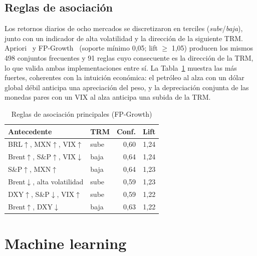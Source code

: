 \documentclass[conference]{IEEEtran}
\begin{document}
\subsection{Reglas de asociación}
Los retornos diarios de ocho mercados se discretizaron en terciles (\emph{sube}/\emph{baja}), junto con un indicador de alta volatilidad y la dirección de la siguiente TRM. Apriori~\cite{agrawal1994} y FP-Growth~\cite{han2000} (soporte mínimo 0,05; lift $\geq$ 1,05) producen los mismos 498 conjuntos frecuentes y 91 reglas cuyo consecuente es la dirección de la TRM, lo que valida ambas implementaciones entre sí. La Tabla~\ref{tab:rules} muestra las más fuertes, coherentes con la intuición económica: el petróleo al alza con un dólar global débil anticipa una apreciación del peso, y la depreciación conjunta de las monedas pares con un VIX al alza anticipa una subida de la TRM.

\begin{table}[t]
\caption{Reglas de asociación principales (FP-Growth)}
\label{tab:rules}
\centering
\footnotesize
\begin{tabular}{@{}p{3.6cm}p{0.9cm}rr@{}}
\toprule
Antecedente & TRM & Conf. & Lift \\
\midrule
BRL$\uparrow$, MXN$\uparrow$, VIX$\uparrow$ & sube & 0,60 & 1,24 \\
Brent$\uparrow$, S\&P$\uparrow$, VIX$\downarrow$ & baja & 0,64 & 1,24 \\
S\&P$\uparrow$, MXN$\uparrow$ & baja & 0,64 & 1,23 \\
Brent$\downarrow$, alta volatilidad & sube & 0,59 & 1,23 \\
DXY$\uparrow$, S\&P$\downarrow$, VIX$\uparrow$ & sube & 0,59 & 1,22 \\
Brent$\uparrow$, DXY$\downarrow$ & baja & 0,63 & 1,22 \\
\bottomrule
\end{tabular}
\end{table}

\section{Machine learning}
\end{document}
